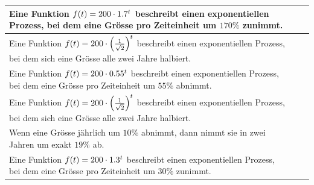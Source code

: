 \documentclass[11pt]{exam}
\begin{document}
\begin{questions}
\begin{table}[h]
\begin{tabular}{|p{12cm}|c|c|}
        Eine Funktion $f(t)=200\cdot1.7^t$ beschreibt einen exponentiellen Prozess, bei dem eine Grösse pro Zeiteinheit um $170\%$ zunimmt. & & \\\hline
        Eine Funktion $f(t)=200\cdot\left(\frac{1}{\sqrt{2}}\right)^t$ beschreibt einen exponentiellen Prozess, bei dem sich eine Grösse alle zwei Jahre halbiert. & & \\\hline
        Eine Funktion $f(t)=200\cdot0.55^t$ beschreibt einen exponentiellen Prozess, bei dem eine Grösse pro Zeiteinheit um $55\%$ abnimmt. & & \\\hline
        Eine Funktion $f(t)=200\cdot\left(\frac{1}{\sqrt{2}}\right)^t$ beschreibt einen exponentiellen Prozess, bei dem sich eine Grösse alle zwei Jahre halbiert. & & \\\hline
        Wenn eine Grösse jährlich um $10\%$ abnimmt, dann nimmt sie in zwei Jahren um exakt $19\%$ ab. & & \\\hline
        Eine Funktion $f(t)=200\cdot1.3^t$ beschreibt einen exponentiellen Prozess, bei dem eine Grösse pro Zeiteinheit um $30\%$ zunimmt. & & \\\hline
    \end{tabular}
\end{table}
\endgroup






\end{questions}
\end{document}
